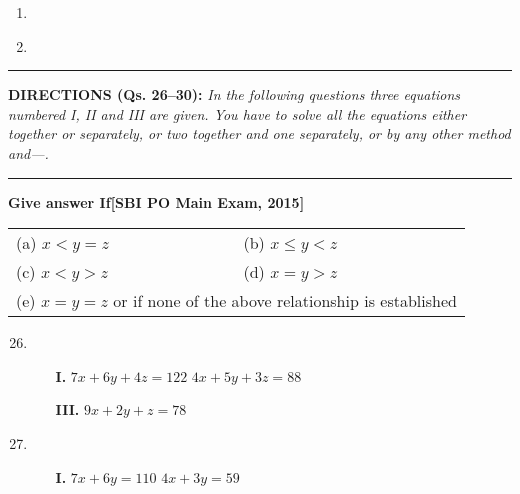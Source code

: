 \begin{multicols}{2}
\begin{enumerate}[leftmargin=*]
\item 
\begin{itemize}
\end{itemize}

\item 
\begin{itemize}
\end{itemize}
\end{enumerate}


\noindent
\rule{\columnwidth}{1pt}

\noindent
{\sf\bfseries DIRECTIONS (Qs. 26--30):} {\it In the following questions three equations numbered I, II and III are given. You have to solve all the equations either together or separately, or two together and one separately, or by any other method and---.}

\noindent
\rule{\columnwidth}{1pt}

\noindent
{\bf Give answer If}\hfill {\bf[SBI PO Main Exam, 2015]}

\begin{tabular}{l@{\qquad\quad}l}
(a) $x<y=z$ & (b) $x\leq y<z$\\
(c) $x<y>z$ & (d) $x=y>z$\\
\multicolumn{2}{p{7.5cm}}{(e) $x=y=z$ or if none of the above relationship\newline \phantom{aai} is established}
\end{tabular}


\begin{enumerate}[leftmargin=*]
\setcounter{enumi}{25}
\item 
\begin{itemize}
\item[{\bf I.}] $7x+6y+4z=122$ $4x+5y+3z=88$

\item[{\bf III.}] $9x+2y+z=78$
\end{itemize}

\item 
\begin{itemize}
\item[{\bf I.}] $7x+6y=110$\qquad{} $4x+3y=59$


\end{itemize}
\end{enumerate}
\end{multicols}
